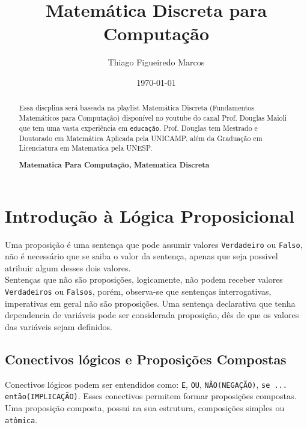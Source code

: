 \documentclass[12pt, onecolumn]{article}
\title{Matemática Discreta para Computação}
\author{Thiago Figueiredo Marcos}
\date{\today}
\begin{document}
	\maketitle
	
	\begin{abstract}
		Essa discplina será baseada na playlist Matemática Discreta
		(Fundamentos Matemáticos para Computação) disponível no youtube do canal 
		Prof. Douglas Maioli que tem uma vasta experiência em \texttt{educação}.
		Prof. Douglas tem Mestrado e Doutorado em Matemática Aplicada pela
		UNICAMP, além da Graduação em Licenciatura em Matematica pela UNESP.

		\textbf{Matematica Para Computação, Matematica Discreta}
	\end{abstract}


		\section{\cetering Introdução à Lógica Proposicional}

	Uma proposição é uma sentença que pode assumir valores \texttt{Verdadeiro} 
	ou \texttt{Falso}, não é necessário que se saiba o valor da sentença, apenas
	que seja possivel atribuir algum desses dois valores.\\
	\newline
	Sentenças que não são proposições, logicamente, não podem receber valores
	\texttt{Verdadeiros} ou \texttt{Falsos}, porém, observa-se que sentenças
	interrogativas, imperativas em geral não são proposições. Uma sentença 
	declarativa que tenha dependencia de variáveis pode ser considerada
	proposição, dês de que os valores das variáveis sejam definidos.
	
		\subsection{Conectivos lógicos e Proposições Compostas}

	Conectivos lógicos podem ser entendidos como: \texttt{E}, \texttt{OU}, 
	\texttt{NÃO(NEGAÇÃO)}, \texttt{se ... então(IMPLICAÇÃO)}. Esses conectivos 
	permitem formar proposições compostas. \\
	\newline
	Uma proposição composta, possui na sua estrutura, composições simples ou 
	\texttt{atômica}.
\end{document}
